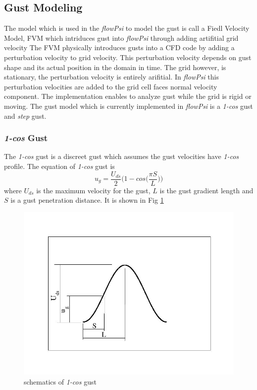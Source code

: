 \subsection{Gust Modeling}

The model which is used in the \emph{flowPsi} to model the gust is call a 
Fiedl Velocity Model, FVM which intriduces gust into \emph{flowPsi} through adding 
artifitial grid velocity
The FVM physically introduces gusts into a CFD code by adding a perturbation velocity\cite{Parameswaran,Singh}
to grid velocity. This perturbation velocity depends on gust shape and its actual position in the domain
in time. The grid however, is stationary, the perturbation velocity is entirely arifitial.  
In \emph{flowPsi} this perturbation velocities are added to the grid cell faces normal velocity component.
The implementation enables to analyze gust while the grid is rigid or moving.  
The gust model which is currently implemented in \emph{flowPsi} is a \emph{1-cos} gust and 
\emph{step} gust.

\subsubsection{\emph{1-cos} Gust}
The \emph{1-cos} gust is a discreet gust which assumes the gust velocities have \emph{1-cos} profile\cite{USDT}.
The equation of  \emph{1-cos} gust is 
\begin{equation}
u_g = \frac{U_{ds}}{2}\Bigg(1-cos\Big(\frac{\pi S}{L}\Big)\Bigg)
\end{equation}
where $U_{ds}$ is the maximum velocity for the gust, $L$ is the gust gradient length 
and $S$ is a gust penetration distance. It is shown in Fig \ref{1-cosgust}
\begin{figure}[htbp]
  \centering\includegraphics[clip,width=.5\textwidth]{Figures/gust.jpg}
\caption{schematics of \emph{1-cos} gust}\label{1-cosgust}
\end{figure}

